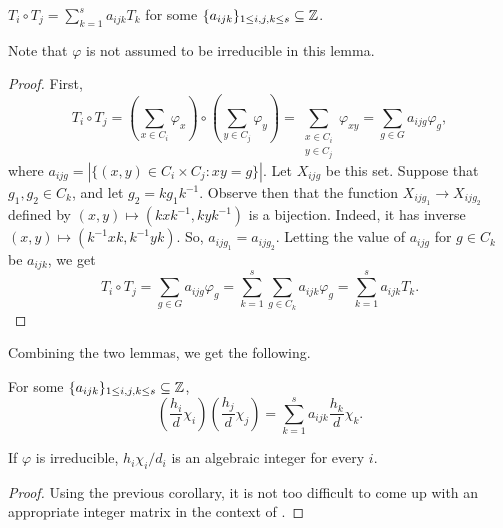 	\begin{flem}
		$T_i \circ T_j = \sum_{k=1}^s a_{ijk} T_k$ for some $\{a_{ijk}\}_{1\le i,j,k\le s} \subseteq \mathbb{Z}$.
	\end{flem}
	Note that $\varphi$ is not assumed to be irreducible in this lemma.
	\begin{proof}
		First,
		\[ T_i \circ T_j = \left(\sum_{x \in C_i} \varphi_x\right) \circ \left(\sum_{y \in C_j} \varphi_y\right) = \sum_{\substack{x \in C_i \\ y \in C_j}} \varphi_{xy} = \sum_{g \in G} a_{ijg} \varphi_g, \]
		where $a_{ijg} = |\{(x,y) \in C_i \times C_j : xy = g\}|$. Let $X_{ijg}$ be this set. Suppose that $g_1,g_2 \in C_k$, and let $g_2 = kg_1k^{-1}$. Observe then that the function $X_{ijg_1} \to X_{ijg_2}$ defined by $(x,y) \mapsto (kxk^{-1},kyk^{-1})$ is a bijection. Indeed, it has inverse $(x,y) \mapsto (k^{-1}xk,k^{-1}yk)$. So, $a_{ijg_1} = a_{ijg_2}$. Letting the value of $a_{ijg}$ for $g \in C_k$ be $a_{ijk}$, we get
		\[ T_i \circ T_j = \sum_{g \in G} a_{ijg} \varphi_g = \sum_{k=1}^s \sum_{g \in C_k} a_{ijk} \varphi_g = \sum_{k=1}^s a_{ijk} T_k. \]
	\end{proof}

	Combining the two lemmas, we get the following.

	\begin{fcor}
		For some $\{a_{ijk}\}_{1\le i,j,k\le s} \subseteq \mathbb{Z}$,
		\[ \left( \frac{h_i}{d} \chi_i \right) \left( \frac{h_j}{d} \chi_j \right) = \sum_{k=1}^s a_{ijk} \frac{h_k}{d} \chi_k. \]
	\end{fcor}

	\begin{flem}
		\label{lemma: hi chii di alg int}
		If $\varphi$ is irreducible, $h_i \chi_i/d_i$ is an algebraic integer for every $i$.
	\end{flem}
	\begin{proof}
		Using the previous corollary, it is not too difficult to come up with an appropriate integer matrix in the context of .
	\end{proof}

